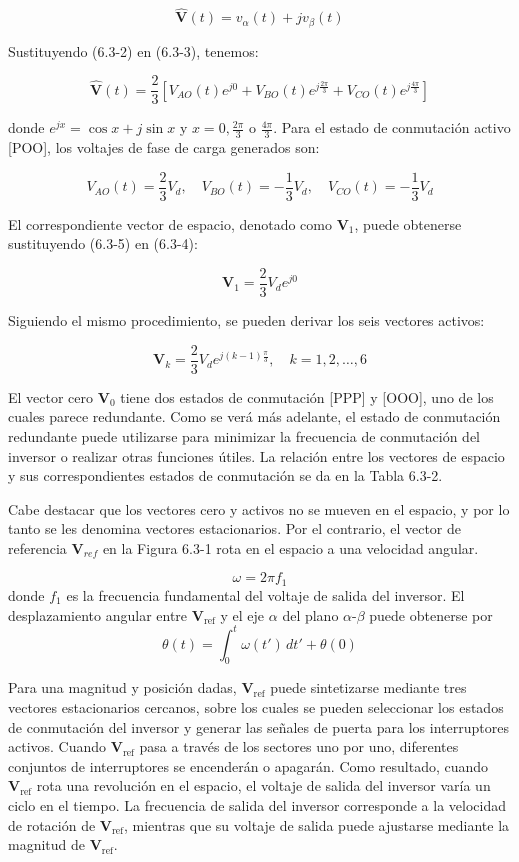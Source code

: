 \documentclass[letterpaper,12pt]{article}
\begin{document}
\[
\mathbf{\hat{V}}(t) = v_{\alpha}(t) + jv_{\beta}(t)
\]
    
Sustituyendo (6.3-2) en (6.3-3), tenemos:
    
\[
\mathbf{\hat{V}}(t) = \frac{2}{3} [V_{AO}(t)e^{j0} + V_{BO}(t)e^{j\frac{2\pi}{3}} + V_{CO}(t)e^{j\frac{4\pi}{3}}]
\]
    
donde $e^{jx} = \cos x + j\sin x$ y $x = 0, \frac{2\pi}{3}$ o $\frac{4\pi}{3}$. Para el estado de conmutación activo [POO], los voltajes de fase de carga generados son:
    
\[
V_{AO}(t) = \frac{2}{3} V_d, \quad V_{BO}(t) = -\frac{1}{3} V_d, \quad V_{CO}(t) = -\frac{1}{3} V_d
\]
    
El correspondiente vector de espacio, denotado como $\mathbf{V}_1$, puede obtenerse sustituyendo (6.3-5) en (6.3-4):
    
\[
\mathbf{V}_1 = \frac{2}{3} V_d e^{j0}
\]
    
Siguiendo el mismo procedimiento, se pueden derivar los seis vectores activos:
    
\[
\mathbf{V}_k = \frac{2}{3} V_d e^{j\left(k-1\right) \frac{\pi}{3}}, \quad k = 1, 2, \ldots, 6
\]
    
El vector cero $\mathbf{V}_0$ tiene dos estados de conmutación [PPP] y [OOO], uno de los cuales parece redundante. Como se verá más adelante, el estado de conmutación redundante puede utilizarse para minimizar la frecuencia de conmutación del inversor o realizar otras funciones útiles. La relación entre los vectores de espacio y sus correspondientes estados de conmutación se da en la Tabla 6.3-2.

Cabe destacar que los vectores cero y activos no se mueven en el espacio, y por lo tanto se les denomina vectores estacionarios. Por el contrario, el vector de referencia $\mathbf{V}_{ref}$ en la Figura 6.3-1 rota en el espacio a una velocidad angular.
    
\[
\omega = 2\pi f_1 \tag{6.3-8}
\]
donde \( f_1 \) es la frecuencia fundamental del voltaje de salida del inversor. El desplazamiento angular entre \( \mathbf{V}_{\text{ref}} \) y el eje $\alpha$ del plano $\alpha$-$\beta$ puede obtenerse por
\[
\theta(t) = \int_0^t \omega(t') \, dt' + \theta(0) \tag{6.3-9}
\]
    
Para una magnitud y posición dadas, \( \mathbf{V}_{\text{ref}} \) puede sintetizarse mediante tres vectores estacionarios cercanos, sobre los cuales se pueden seleccionar los estados de conmutación del inversor y generar las señales de puerta para los interruptores activos. Cuando \( \mathbf{V}_{\text{ref}} \) pasa a través de los sectores uno por uno, diferentes conjuntos de interruptores se encenderán o apagarán. Como resultado, cuando \( \mathbf{V}_{\text{ref}} \) rota una revolución en el espacio, el voltaje de salida del inversor varía un ciclo en el tiempo. La frecuencia de salida del inversor corresponde a la velocidad de rotación de \( \mathbf{V}_{\text{ref}} \), mientras que su voltaje de salida puede ajustarse mediante la magnitud de \( \mathbf{V}_{\text{ref}} \).
\end{document}
